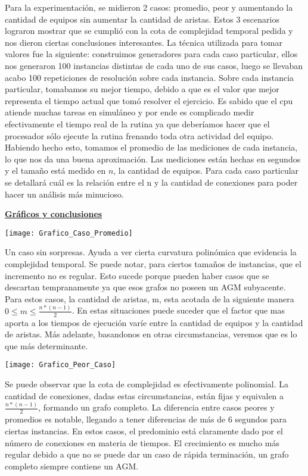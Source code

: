 \documentclass[10pt,a4paper]{article}
\begin{document}
Para la experimentación, se midieron 2 casos: promedio, peor y aumentando la cantidad de equipos sin aumentar la cantidad de aristas. Estos 3 escenarios lograron mostrar que se cumplió con la cota de complejidad temporal pedida y nos dieron ciertas conclusiones interesantes.
La técnica utilizada para tomar valores fue la siguiente: construimos generadores para cada caso particular, ellos nos generaron 100 instancias distintas de cada uno de sus casos, luego se llevaban acabo 100 repeticiones de resolución sobre cada instancia. Sobre cada instancia particular, tomabamos su mejor tiempo, debido a que es el valor que mejor representa el tiempo actual que tomó resolver el ejercicio. Es sabido que el cpu atiende muchas tareas en simuláneo y por ende es complicado medir efectivamente el tiempo real de la rutina ya que deberíamos hacer que el procesador sólo ejecute la rutina frenando toda otra actividad del equipo. Habiendo hecho esto, tomamos el promedio de las mediciones de cada instancia, lo que nos da una buena aproximación. Las mediciones están hechas en segundos y el tamaño está medido en $n$, la cantidad de equipos. Para cada caso particular se detallará cuál es la relación entre el n y la cantidad de conexiones para poder hacer un análisis más minucioso.

\noindent \textbf{\underline{Gráficos y conclusiones}}

\texttt{[image: Grafico\_Caso\_Promedio]}

Un caso sin sorpresas. Ayuda a ver cierta curvatura polinómica que evidencia la complejidad temporal. Se puede notar, para ciertos tamaños de instancias, que el incremento no es regular. Esto sucede porque pueden haber casos que se descartan tempranamente ya que esos grafos no poseen un AGM subyacente. Para estos casos, la cantidad de aristas, m, esta acotada de la siguiente manera $0 \leq m \leq \frac{n*(n-1)}{2}$. En estas situaciones puede suceder que el factor que mas aporta a los tiempos de ejecución varíe entre la cantidad de equipos y la cantidad de aristas. Más adelante, basandonos en otras circumstancias, veremos que es lo que más determinante.

\texttt{[image: Grafico\_Peor\_Caso]}

Se puede observar que la cota de complejidad es efectivamente polinomial. La cantidad de conexiones, dadas estas circumstancias, están fijas y equivalen a $\frac{n*(n-1)}{2}$, formando un grafo completo. La diferencia entre casos peores y promedios es notable, llegando a tener diferencias de más de 6 segundos para ciertas instancias. En estos casos, el predominio está claramente dado por el número de conexiones en materia de tiempos. El crecimiento es mucho más regular debido a que no se puede dar un caso de rápida terminación, un grafo completo siempre contiene un AGM.
\end{document}
